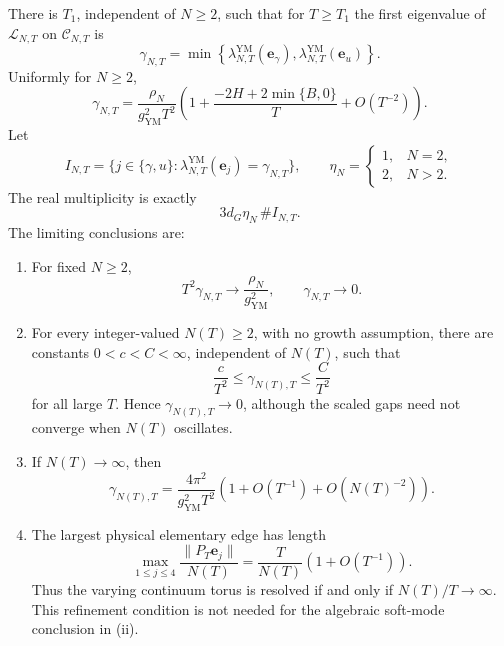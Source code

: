 \begin{theorem}
\label{cusp-gauge-finite-gap-limits}
There is \(T_1\), independent of \(N\ge2\), such that for \(T\ge T_1\) the
first eigenvalue of \(\mathcal L_{N,T}\) on \(\mathscr C_{N,T}\) is
\begin{equation}
 \gamma_{N,T}
 =\min\left\{
   \lambda_{N,T}^{\mathrm{YM}}(\mathbf e_\gamma),
   \lambda_{N,T}^{\mathrm{YM}}(\mathbf e_u)
 \right\}.
 \label{cusp-gauge-finite-gap-exact}
\end{equation}
Uniformly for \(N\ge2\),
\begin{equation}
 \gamma_{N,T}
 =\frac{\rho_N}{g_{\mathrm{YM}}^2T^2}
 \left(
  1+\frac{-2H+2\min\{B,0\}}T+O(T^{-2})
 \right).
 \label{cusp-gauge-finite-gap-expansion}
\end{equation}
Let
\[
 I_{N,T}=\{j\in\{\gamma,u\}:
 \lambda_{N,T}^{\mathrm{YM}}(\mathbf e_j)=\gamma_{N,T}\},
 \qquad
 \eta_N=\begin{cases}1,&N=2,\\2,&N>2.\end{cases}
\]
The real multiplicity is exactly
\begin{equation}
 3d_G\eta_N\,\#I_{N,T}.
 \label{cusp-gauge-finite-gap-multiplicity}
\end{equation}
The limiting conclusions are:
\begin{enumerate}[label=(\roman*)]
\item For fixed \(N\ge2\),
\begin{equation}
 T^2\gamma_{N,T}
 \longrightarrow\frac{\rho_N}{g_{\mathrm{YM}}^2},
 \qquad \gamma_{N,T}\longrightarrow0.
 \label{cusp-gauge-finite-fixed-N}
\end{equation}
\item For every integer-valued \(N(T)\ge2\), with no growth assumption,
there are constants \(0<c<C<\infty\), independent of \(N(T)\), such that
\begin{equation}
 \frac{c}{T^2}\le\gamma_{N(T),T}\le\frac{C}{T^2}
 \label{cusp-gauge-finite-arbitrary-N}
\end{equation}
for all large \(T\).  Hence \(\gamma_{N(T),T}\to0\), although the scaled
gaps need not converge when \(N(T)\) oscillates.
\item If \(N(T)\to\infty\), then
\begin{equation}
 \gamma_{N(T),T}
 =\frac{4\pi^2}{g_{\mathrm{YM}}^2T^2}
  \left(1+O(T^{-1})+O(N(T)^{-2})\right).
 \label{cusp-gauge-finite-growing-N}
\end{equation}
\item The largest physical elementary edge has length
\begin{equation}
 \max_{1\le j\le4}
 \frac{\lVert P_T\mathbf e_j\rVert}{N(T)}
 =\frac{T}{N(T)}(1+O(T^{-1})).
 \label{cusp-gauge-finite-mesh-size}
\end{equation}
Thus the varying continuum torus is resolved if and only if
\(N(T)/T\to\infty\).  This refinement condition is not needed for the
algebraic soft-mode conclusion in (ii).
\end{enumerate}
\end{theorem}

